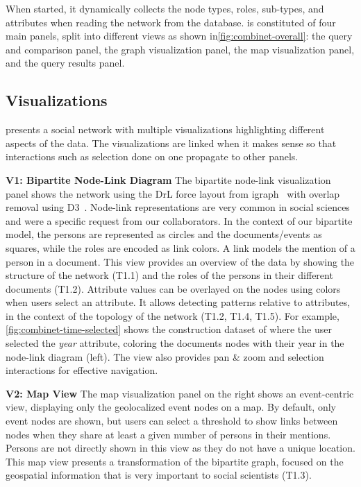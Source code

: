 When started, it dynamically collects the node types, roles, sub-types, and attributes when reading the network from the database. \name is constituted of four main panels, split into different views as shown in\autoref{fig:combinet-overall}: the query and comparison panel, the graph visualization panel, the map visualization panel, and the query results panel.


\subsection{Visualizations}

\name presents a social network with multiple visualizations highlighting different aspects of the data.
The visualizations are linked when it makes sense so that interactions such as selection done on one propagate to other panels.

\noindent\textbf{V1: Bipartite Node-Link Diagram}
The bipartite node-link visualization panel shows the network using the DrL force layout from igraph~\cite{igraph} with overlap removal using D3~\cite{d3}.
Node-link representations are very common in social sciences~\cite{Gephi, mrvarAnalysisVisualizationLarge2016, NodeXL} and were a specific request from our collaborators.
In the context of our bipartite model, the persons are represented as circles and the documents/events as squares, while the roles are encoded as link colors.
A link models the mention of a person in a document.
This view provides an overview of the data by showing the structure of the network (T1.1) and the roles of the persons in their different documents (T1.2).
Attribute values can be overlayed on the nodes using colors when users select an attribute. It allows detecting patterns relative to attributes, in the context of the topology of the network (T1.2, T1.4, T1.5). For example, \autoref{fig:combinet-time-selected} shows the construction dataset of \pascal where the user selected the \textit{year} attribute, coloring the documents nodes with their year in the node-link diagram (left).
The view also provides pan \& zoom and selection interactions for effective navigation.

\noindent\textbf{V2: Map View}
The map visualization panel on the right shows an event-centric view, displaying only the geolocalized event nodes on a map.
By default, only event nodes are shown, but users can select a threshold to show links between nodes when they share at least a given number of persons in their mentions.
Persons are not directly shown in this view as they do not have a unique location.
This map view presents a transformation of the bipartite graph, focused on the geospatial information that is very important to social scientists (T1.3).

